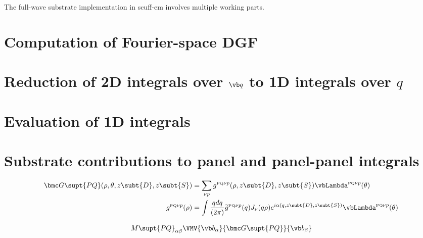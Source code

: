 \documentclass[letterpaper]{article}
\renewcommand{\wt}{\widetilde}
\begin{document}
The full-wave substrate implementation in {\sc scuff-em} involves multiple 
working parts. 

\newpage
\section{Computation of Fourier-space DGF}
\label{GTwiddleSection}

\section{Reduction of 2D integrals over $\vb q$ to 1D integrals over $q$}
\label{TwoD2OneDSection}

\newpage
\section{Evaluation of 1D integrals}

\newpage
\section{Substrate contributions to panel and panel-panel integrals}

\begin{align*}
 \bmc G\supt{PQ}(\rho, \theta, z\subt{D}, z\subt{S})
  &= \sum_{\nu p} 
      g^{\text{\tiny PQ}\nu p}(\rho, z\subt{D}, z\subt{S})
      \vbLambda^{\text{\tiny PQ}\nu p}(\theta)
\label{GPQExpression}
\\
g^{\text{\tiny PQ}\nu p}(\rho)
&=\int \frac{qdq}{(2\pi)}
       \wt{g}^{\text{\tiny PQ}\nu p}(q)
        J_\nu(q\rho) e^{i\alpha(q,z\subt{D},z\subt{S})} 
        \vbLambda^{\text{\tiny PQ}\nu p}(\theta)
\end{align*}

\begin{align*}
M\supt{PQ}_{\alpha\beta}
 \VMV{\vb b_\alpha}{\bmc G\supt{PQ}}{\vb b_\beta}
\end{align*}

\end{document}
